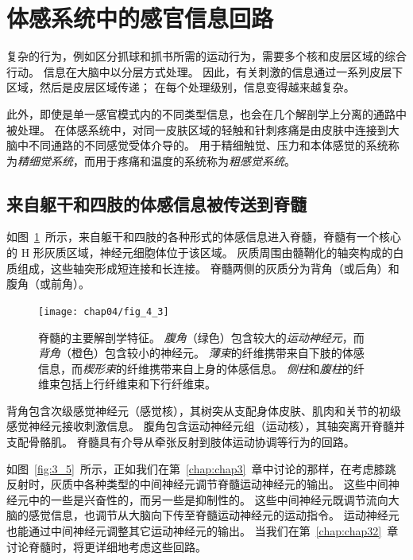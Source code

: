 \section{体感系统中的感官信息回路}

复杂的行为，例如区分抓球和抓书所需的运动行为，需要多个核和皮层区域的综合行动。
信息在大脑中以分层方式处理。
因此，有关刺激的信息通过一系列皮层下区域，然后是皮层区域传递； 
在每个处理级别，信息变得越来越复杂。


此外，即使是单一感官模式内的不同类型信息，也会在几个解剖学上分离的通路中被处理。
在体感系统中，对同一皮肤区域的轻触和针刺疼痛是由皮肤中连接到大脑中不同通路的不同感觉受体介导的。 
用于精细触觉、压力和本体感觉的系统称为\textit{精细觉系统}，而用于疼痛和温度的系统称为\textit{粗感觉系统}。



\subsection{来自躯干和四肢的体感信息被传送到脊髓}

如图~\ref{fig:4_3}~所示，来自躯干和四肢的各种形式的体感信息进入脊髓，脊髓有一个核心的 H 形灰质区域，神经元细胞体位于该区域。 
灰质周围由髓鞘化的轴突构成的白质组成，这些轴突形成短连接和长连接。
脊髓两侧的灰质分为背角（或后角）和腹角（或前角）。


\begin{figure}[htbp]
	\centering
	\texttt{[image: chap04/fig\_4\_3]}
	\caption{脊髓的主要解剖学特征。 
		\textit{腹角}（绿色）包含较大的\textit{运动神经元}，而\textit{背角}（橙色）包含较小的神经元。
		\textit{薄束}的纤维携带来自下肢的体感信息，而\textit{楔形束}的纤维携带来自上身的体感信息。
		\textit{侧柱}和\textit{腹柱}的纤维束包括上行纤维束和下行纤维束。}
	\label{fig:4_3}
\end{figure}


背角包含次级感觉神经元（感觉核），其树突从支配身体皮肤、肌肉和关节的初级感觉神经元接收刺激信息。
腹角包含运动神经元组（运动核），其轴突离开脊髓并支配骨骼肌。
脊髓具有介导从牵张反射到肢体运动协调等行为的回路。


如图~\ref{fig:3_5}~所示，正如我们在第~\ref{chap:chap3}~章中讨论的那样，在考虑膝跳反射时，灰质中各种类型的中间神经元调节脊髓运动神经元的输出。 
这些中间神经元中的一些是兴奋性的，而另一些是抑制性的。
这些中间神经元既调节流向大脑的感觉信息，也调节从大脑向下传至脊髓运动神经元的运动指令。
运动神经元也能通过中间神经元调整其它运动神经元的输出。
当我们在第~\ref{chap:chap32}~章讨论脊髓时，将更详细地考虑这些回路。


